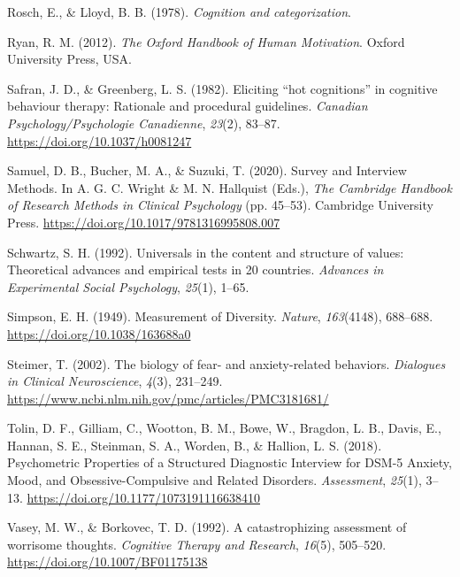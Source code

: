 \documentclass[
  man,floatsintext]{apa7}
\newlength{\cslhangindent}
\newlength{\cslentryspacingunit} %
\newenvironment{CSLReferences}[2] %
 {%
  \setlength{\parindent}{0pt}
  \ifodd #1
  \let\oldpar\par
  \def\par{\hangindent=\cslhangindent\oldpar}
  \fi
  \setlength{\parskip}{#2\cslentryspacingunit}
 }%
 {}
\begin{document}
\begin{CSLReferences}{1}{0}
\leavevmode{}%
Rosch, E., \& Lloyd, B. B. (1978). \emph{Cognition and categorization}.

\leavevmode{}%
Ryan, R. M. (2012). \emph{The Oxford Handbook of Human Motivation}. Oxford University Press, USA.

\leavevmode{}%
Safran, J. D., \& Greenberg, L. S. (1982). Eliciting {``hot cognitions''} in cognitive behaviour therapy: Rationale and procedural guidelines. \emph{Canadian Psychology/Psychologie Canadienne}, \emph{23}(2), 83--87. \url{https://doi.org/10.1037/h0081247}

\leavevmode{}%
Samuel, D. B., Bucher, M. A., \& Suzuki, T. (2020). Survey and Interview Methods. In A. G. C. Wright \& M. N. Hallquist (Eds.), \emph{The Cambridge Handbook of Research Methods in Clinical Psychology} (pp. 45--53). Cambridge University Press. \url{https://doi.org/10.1017/9781316995808.007}

\leavevmode{}%
Schwartz, S. H. (1992). Universals in the content and structure of values: Theoretical advances and empirical tests in 20 countries. \emph{Advances in Experimental Social Psychology}, \emph{25}(1), 1--65.

\leavevmode{}%
Simpson, E. H. (1949). Measurement of Diversity. \emph{Nature}, \emph{163}(4148), 688--688. \url{https://doi.org/10.1038/163688a0}

\leavevmode{}%
Steimer, T. (2002). The biology of fear- and anxiety-related behaviors. \emph{Dialogues in Clinical Neuroscience}, \emph{4}(3), 231--249. \url{https://www.ncbi.nlm.nih.gov/pmc/articles/PMC3181681/}

\leavevmode{}%
Tolin, D. F., Gilliam, C., Wootton, B. M., Bowe, W., Bragdon, L. B., Davis, E., Hannan, S. E., Steinman, S. A., Worden, B., \& Hallion, L. S. (2018). Psychometric Properties of a Structured Diagnostic Interview for DSM-5 Anxiety, Mood, and Obsessive-Compulsive and Related Disorders. \emph{Assessment}, \emph{25}(1), 3--13. \url{https://doi.org/10.1177/1073191116638410}

\leavevmode{}%
Vasey, M. W., \& Borkovec, T. D. (1992). A catastrophizing assessment of worrisome thoughts. \emph{Cognitive Therapy and Research}, \emph{16}(5), 505--520. \url{https://doi.org/10.1007/BF01175138}


\end{CSLReferences}
\end{document}
